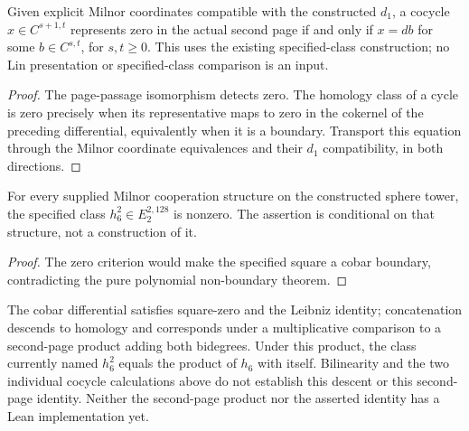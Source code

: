 \begin{proposition}
  \label{prop:h6-standard-class-zero-criterion}
  \leanok
  Given explicit Milnor coordinates compatible with the constructed $d_1$,
  a cocycle $x\in C^{s+1,t}$ represents zero in the actual second page if
  and only if $x=db$ for some $b\in C^{s,t}$, for $s,t\ge0$.
  This uses the existing specified-class construction; no Lin presentation
  or specified-class comparison is an input.
\end{proposition}
\begin{proof}
  The page-passage isomorphism detects zero. The homology class of a cycle
  is zero precisely when its representative maps to zero in the cokernel
  of the preceding differential, equivalently when it is a boundary.
  Transport this equation through the Milnor coordinate equivalences and
  their $d_1$ compatibility, in both directions.
  \leanok
\end{proof}

\begin{proposition}
  \label{prop:h6-standard-square-nonzero}
  \leanok
  For every supplied Milnor cooperation structure on the constructed sphere
  tower, the specified class $h_6^2\in E_2^{2,128}$ is nonzero.
  The assertion is conditional on that structure, not a construction of it.
\end{proposition}
\begin{proof}
  The zero criterion would make the specified square a cobar boundary,
  contradicting the pure polynomial non-boundary theorem.
  \leanok
\end{proof}

\begin{proposition}
  \label{prop:h6-e2-square-identity}
  \notready
  The cobar differential satisfies square-zero and the Leibniz identity;
  concatenation descends to homology and corresponds under a multiplicative
  comparison to a second-page product adding both bidegrees. Under this product,
  the class currently named $h_6^2$ equals the product of $h_6$ with itself.
  Bilinearity and the two individual cocycle calculations above do not
  establish this descent or this second-page identity. Neither the
  second-page product nor the asserted identity has a Lean implementation yet.
\end{proposition}

